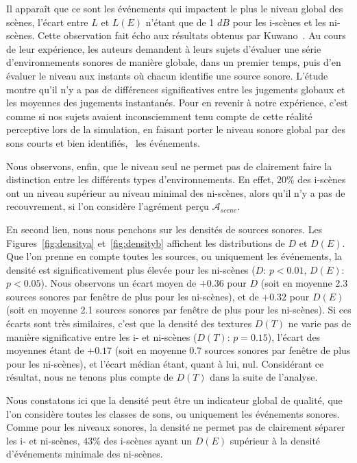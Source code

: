 
Il apparaît que ce sont les événements qui impactent le plus le niveau global des scènes, l'écart entre $L$ et $L(E)$ n'étant que de 1 $dB$ pour les i-scènes et les ni-scènes. Cette observation fait écho aux résultats obtenus par Kuwano~\al \citep{kuwano_memory_2003}. Au cours de leur expérience, les auteurs demandent à leurs sujets d'évaluer une série d'environnements sonores de manière globale, dans un premier temps, puis d'en évaluer le niveau aux instants où chacun identifie une source sonore. L'étude montre qu'il n'y a pas de différences significatives entre les jugements globaux et les moyennes des jugements instantanés. Pour en revenir à notre expérience, c'est comme si nos sujets avaient inconsciemment tenu compte de cette réalité perceptive lors de la simulation, en faisant porter le niveau sonore global par des sons courts et bien identifiés, \ie~les événements.

Nous observons, enfin, que le niveau seul ne permet pas de clairement faire la distinction entre les différents types d'environnements. En effet, $20\%$ des i-scènes ont un niveau supérieur au niveau minimal des ni-scènes, alors qu'il n'y a pas de recouvrement, si l'on considère l'agrément perçu $\mathcal{A}_{scene}$.

En second lieu, nous nous penchons sur les densités de sources sonores. Les Figures~\ref{fig:densitya} et~\ref{fig:densityb} affichent les distributions de $D$ et $D(E)$. Que l'on prenne en compte toutes les sources, ou uniquement les événements, la densité est significativement plus élevée pour les ni-scènes ($D$: $p<0.01$, $D(E)$: $p<0.05$). Nous observons un écart moyen de $+0.36$ pour $D$ (soit en moyenne 2.3 sources sonores par fenêtre de plus pour les ni-scènes), et de $+0.32$ pour $D(E)$ (soit en moyenne 2.1 sources sonores par fenêtre de plus pour les ni-scènes). Si ces écarts sont très similaires, c'est que la densité des textures $D(T)$ ne varie pas de manière significative entre les i- et ni-scènes ($D(T)$: $p=0.15$), l'écart des moyennes étant de $+0.17$ (soit en moyenne 0.7 sources sonores par fenêtre de plus pour les ni-scènes), et l'écart médian étant, quant à lui, nul. Considérant  ce résultat, nous ne tenons plus compte de $D(T)$ dans la suite de l'analyse.

Nous constatons ici que la densité peut être un indicateur global de qualité, que l'on considère toutes les classes de sons, ou uniquement les événements sonores. Comme pour les niveaux sonores, la densité ne permet pas de clairement séparer les i- et ni-scènes,  $43\%$ des i-scènes ayant un $D(E)$ supérieur à la densité d'événements minimale des ni-scènes.

